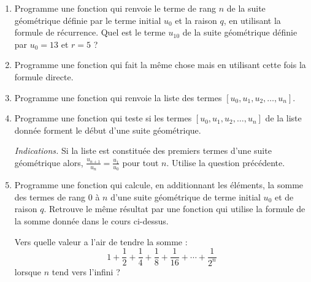 \documentclass[11pt,class=report,crop=false]{standalone}
\begin{document}
\begin{activite}


\begin{enumerate}
  \item Programme une fonction  qui renvoie le terme de rang $n$ de la suite géométrique définie par le terme initial $u_0$ et la raison $q$, en utilisant la formule de récurrence.
  Quel est le terme $u_{10}$ de la suite géométrique définie par $u_0 = 13$ et $r=5$ ?
  
  \item Programme une fonction  qui fait la même chose mais en utilisant cette fois la formule directe.
  
  \item Programme une fonction  qui renvoie la liste des termes $[u_0,u_1,u_2,\ldots,u_n]$.
  
  \item Programme une fonction  qui teste si les termes $[u_0,u_1,u_2,\ldots,u_n]$ de la liste donnée forment le début d'une suite géométrique. 
  
  \emph{Indications.} 
 Si la liste est constituée des premiers termes d'une suite géométrique alors,  $\frac{u_{n+1}}{u_n} = \frac{u_1}{u_0}$ pour tout $n$. Utilise la question précédente.
 
  \item Programme une fonction  
  qui calcule, en additionnant les éléments, la somme des termes de rang $0$ à $n$ d'une suite géométrique de terme initial $u_0$ et de raison $q$. 
Retrouve le même résultat par une fonction  
qui utilise la formule de la somme donnée dans le cours ci-dessus.

Vers quelle valeur a l'air de tendre la somme :
$$1+\frac12+\frac14+\frac18+\frac1{16} + \cdots +\frac{1}{2^n}$$
lorsque $n$ tend vers l'infini ?
  
\end{enumerate} 
\end{activite}




\end{document}
